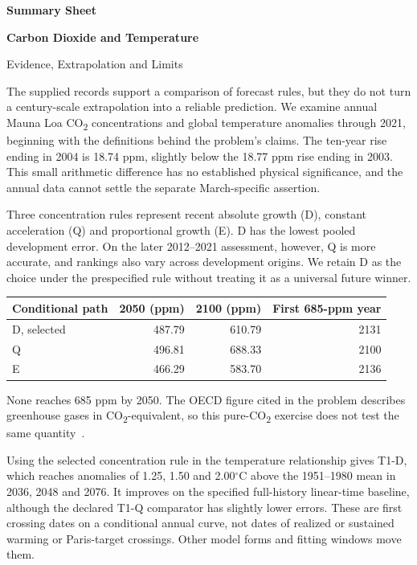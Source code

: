 \documentclass[11pt,a4paper]{article}
\newcommand{\p}[2]{#2\par}
\newcommand{\CO}{CO\textsubscript{2}}
\newcommand{\degC}{\ensuremath{{}^{\circ}\mathrm{C}}}
\begin{document}
\begin{center}
{\large\bfseries Summary Sheet}\par\vspace{9pt}
{\LARGE\bfseries Carbon Dioxide and Temperature}\par\vspace{4pt}
{\large Evidence, Extrapolation and Limits}\par\vspace{10pt}
\end{center}
\p{SUM01}{The supplied records support a comparison of forecast rules, but they do not turn a century-scale extrapolation into a reliable prediction. We examine annual Mauna Loa \CO{} concentrations and global temperature anomalies through 2021, beginning with the definitions behind the problem's claims. The ten-year rise ending in 2004 is 18.74 ppm, slightly below the 18.77 ppm rise ending in 2003. This small arithmetic difference has no established physical significance, and the annual data cannot settle the separate March-specific assertion.}
\p{SUM02}{Three concentration rules represent recent absolute growth (D), constant acceleration (Q) and proportional growth (E). D has the lowest pooled development error. On the later 2012--2021 assessment, however, Q is more accurate, and rankings also vary across development origins. We retain D as the choice under the prespecified rule without treating it as a universal future winner.}
\begin{center}\small
\begin{tabular}{lrrr}\toprule
Conditional path & 2050 (ppm) & 2100 (ppm) & First 685-ppm year\\\midrule
D, selected & 487.79 & 610.79 & 2131\\
Q & 496.81 & 688.33 & 2100\\
E & 466.29 & 583.70 & 2136\\\bottomrule
\end{tabular}
\end{center}
\p{SUM03}{None reaches 685 ppm by 2050. The OECD figure cited in the problem describes greenhouse gases in \CO{}-equivalent, so this pure-\CO{} exercise does not test the same quantity~\cite{oecd}.}
\p{SUM04}{Using the selected concentration rule in the temperature relationship gives T1-D, which reaches anomalies of 1.25, 1.50 and 2.00\degC{} above the 1951--1980 mean in 2036, 2048 and 2076. It improves on the specified full-history linear-time baseline, although the declared T1-Q comparator has slightly lower errors. These are first crossing dates on a conditional annual curve, not dates of realized or sustained warming or Paris-target crossings. Other model forms and fitting windows move them.}
\end{document}
